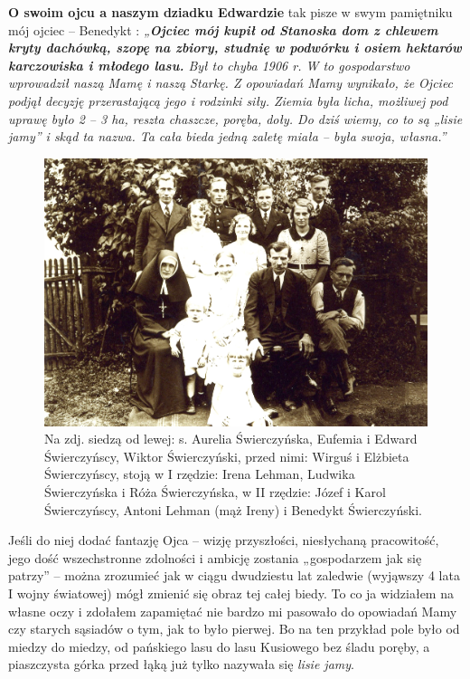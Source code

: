 \textbf{O swoim ojcu a naszym dziadku Edwardzie} tak pisze w swym pamiętniku mój ojciec – Benedykt : \textit{„\textbf{Ojciec mój kupił od Stanoska dom z chlewem kryty dachówką, szopę na zbiory, studnię w podwórku i osiem hektarów karczowiska i młodego lasu.} Był to chyba 1906 r. W to gospodarstwo wprowadził naszą Mamę i naszą Starkę. Z opowiadań Mamy wynikało, że Ojciec podjął decyzję przerastającą jego i rodzinki siły. Ziemia była licha, możliwej pod uprawę było 2 – 3 ha, reszta chaszcze, poręba, doły. Do dziś wiemy, co to są „lisie jamy” i skąd ta nazwa. Ta cała bieda jedną zaletę miała – była swoja, własna.''}

\begin{figure}[!h]
\begin{center}
\includegraphics[width=\textwidth]{photo/rodzina_swierczynskich_2.jpg}
\caption[Rodzina Świerczyńskich z Wirgusiem]{Na zdj. siedzą od lewej: s. Aurelia Świerczyńska, Eufemia i Edward Świerczyńscy, Wiktor Świerczyński, przed nimi: Wirguś i Elżbieta Świerczyńscy, stoją w I rzędzie: Irena Lehman, Ludwika Świerczyńska i Róża Świerczyńska, w II rzędzie: Józef i Karol Świerczyńscy, Antoni Lehman (mąż Ireny) i Benedykt Świerczyński.}
\end{center}
\end{figure}

Jeśli do niej dodać fantazję Ojca – wizję przyszłości, niesłychaną pracowitość, jego dość wszechstronne zdolności i ambicję zostania „gospodarzem jak się patrzy” – można zrozumieć jak w ciągu  dwudziestu lat zaledwie (wyjąwszy 4 lata I wojny światowej) mógł zmienić się obraz tej całej biedy. To co ja widziałem na własne oczy i zdołałem zapamiętać nie bardzo mi pasowało do opowiadań Mamy czy starych sąsiadów o tym, jak to było pierwej. Bo na ten przykład pole było od miedzy do miedzy, od pańskiego lasu do lasu Kusiowego bez śladu poręby, a piaszczysta górka przed łąką już tylko nazywała się \textit{lisie jamy}.


